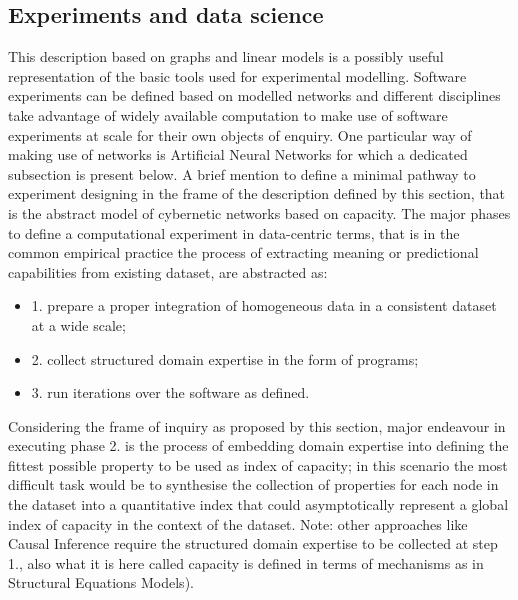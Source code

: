 \documentclass[14pt,a4paper]{extarticle}
\begin{document}
\subsection*{Experiments and data science}
\label{subsec:experiments}
\hspace*{15mm}This description based on graphs and linear models is a possibly useful representation of the basic tools used for experimental modelling. Software experiments can be defined based on modelled networks and different disciplines take advantage of widely available computation to make use of software experiments at scale for their own objects of enquiry. One particular way of making use of networks is Artificial Neural Networks for which a dedicated subsection is present below.
\newline
A brief mention to define a minimal pathway to experiment designing in the frame of the description defined by this section, that is the abstract model of cybernetic networks based on capacity. The major phases to define a computational experiment in data-centric \cite{Andrewng} terms, that is in the common empirical practice the process of extracting meaning or predictional capabilities from existing dataset, are abstracted as:
\begin{itemize}
\item 1. prepare a proper integration of homogeneous data in a consistent dataset at a wide scale;
\item 2. collect structured domain expertise in the form of programs;
\item 3. run iterations over the software as defined.
\end{itemize}
Considering the frame of inquiry as proposed by this section, major endeavour in executing phase 2. is the process of embedding domain expertise into defining the fittest possible property to be used as index of capacity; in this scenario the most difficult task would be to synthesise the collection of properties for each node in the dataset into a quantitative index that could asymptotically represent a global index of capacity in the context of the dataset. Note: other approaches like Causal Inference \cite{pearl2009causality} require the structured domain expertise to be collected at step 1., also what it is here called capacity is defined in terms of mechanisms as in Structural Equations Models).
\newline
\end{document}
